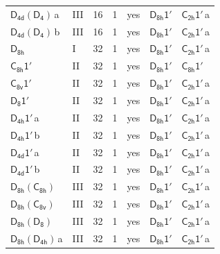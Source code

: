 \documentclass[10pt,a4paper]{article}
\numberwithin{equation}{section}
\newcommand{\grp}[1]{\mathsf{#1}}
\newcommand{\clsletter}[1]{\,{\scriptsize\color{black!55}#1}}
\begin{document}
{\begin{longtable}{@{}llrrlll@{}}
\href{D4d-D4.pdf}{$\grp{D_{4d}}(\grp{D_{4}})$}\clsletter{a} & III & 16 & 1 & yes & \href{D8h-1p.pdf}{$\grp{D_{8h}1'}$} & \href{C2h-1p.pdf}{$\grp{C_{2h}1'}$}\clsletter{a}\\
\href{D4d-D4.pdf}{$\grp{D_{4d}}(\grp{D_{4}})$}\clsletter{b} & III & 16 & 1 & yes & \href{D8h-1p.pdf}{$\grp{D_{8h}1'}$} & \href{C2h-1p.pdf}{$\grp{C_{2h}1'}$}\clsletter{a}\\
\href{../../../rotation/data/pdf/D8h.pdf}{$\grp{D_{8h}}$} & I & 32 & 1 & yes & \href{D8h-1p.pdf}{$\grp{D_{8h}1'}$} & \href{C2h-1p.pdf}{$\grp{C_{2h}1'}$}\clsletter{a}\\
\href{C8h-1p.pdf}{$\grp{C_{8h}1'}$} & II & 32 & 1 & yes & \href{D8h-1p.pdf}{$\grp{D_{8h}1'}$} & \href{C8h-1p.pdf}{$\grp{C_{8h}1'}$}\\
\href{C8v-1p.pdf}{$\grp{C_{8v}1'}$} & II & 32 & 1 & yes & \href{D8h-1p.pdf}{$\grp{D_{8h}1'}$} & \href{C2h-1p.pdf}{$\grp{C_{2h}1'}$}\clsletter{a}\\
\href{D8-1p.pdf}{$\grp{D_{8}1'}$} & II & 32 & 1 & yes & \href{D8h-1p.pdf}{$\grp{D_{8h}1'}$} & \href{C2h-1p.pdf}{$\grp{C_{2h}1'}$}\clsletter{a}\\
\href{D4h-1p.pdf}{$\grp{D_{4h}1'}$}\clsletter{a} & II & 32 & 1 & yes & \href{D8h-1p.pdf}{$\grp{D_{8h}1'}$} & \href{C2h-1p.pdf}{$\grp{C_{2h}1'}$}\clsletter{a}\\
\href{D4h-1p.pdf}{$\grp{D_{4h}1'}$}\clsletter{b} & II & 32 & 1 & yes & \href{D8h-1p.pdf}{$\grp{D_{8h}1'}$} & \href{C2h-1p.pdf}{$\grp{C_{2h}1'}$}\clsletter{a}\\
\href{D4d-1p.pdf}{$\grp{D_{4d}1'}$}\clsletter{a} & II & 32 & 1 & yes & \href{D8h-1p.pdf}{$\grp{D_{8h}1'}$} & \href{C2h-1p.pdf}{$\grp{C_{2h}1'}$}\clsletter{a}\\
\href{D4d-1p.pdf}{$\grp{D_{4d}1'}$}\clsletter{b} & II & 32 & 1 & yes & \href{D8h-1p.pdf}{$\grp{D_{8h}1'}$} & \href{C2h-1p.pdf}{$\grp{C_{2h}1'}$}\clsletter{a}\\
\href{D8h-C8h.pdf}{$\grp{D_{8h}}(\grp{C_{8h}})$} & III & 32 & 1 & yes & \href{D8h-1p.pdf}{$\grp{D_{8h}1'}$} & \href{C2h-1p.pdf}{$\grp{C_{2h}1'}$}\clsletter{a}\\
\href{D8h-C8v.pdf}{$\grp{D_{8h}}(\grp{C_{8v}})$} & III & 32 & 1 & yes & \href{D8h-1p.pdf}{$\grp{D_{8h}1'}$} & \href{C2h-1p.pdf}{$\grp{C_{2h}1'}$}\clsletter{a}\\
\href{D8h-D8.pdf}{$\grp{D_{8h}}(\grp{D_{8}})$} & III & 32 & 1 & yes & \href{D8h-1p.pdf}{$\grp{D_{8h}1'}$} & \href{C2h-1p.pdf}{$\grp{C_{2h}1'}$}\clsletter{a}\\
\href{D8h-D4h.pdf}{$\grp{D_{8h}}(\grp{D_{4h}})$}\clsletter{a} & III & 32 & 1 & yes & \href{D8h-1p.pdf}{$\grp{D_{8h}1'}$} & \href{C2h-1p.pdf}{$\grp{C_{2h}1'}$}\clsletter{a}\\

\end{longtable}}
\end{document}
